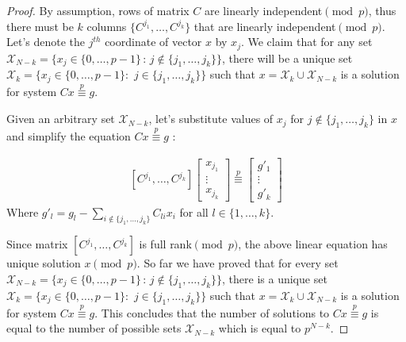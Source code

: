 \documentclass{article}
\begin{document}
\begin{proof}  	
By assumption, rows of matrix $C$ are linearly independent$\pmod{p}$, thus there must be $k$ columns $\{C^{j_1},\ldots,C^{j_k}\}$ that are linearly independent$\pmod{p}$.   
   Let's denote the $j^{th}$ coordinate of vector $x$ by $x_j$. We claim that for any set $\mathcal{X}_{N-k}=\{{x}_j\in\{0,\ldots,p-1\}\, : \, j \notin \{j_1,\ldots,j_k\} \}$, there will be a unique set $\mathcal{X}_k=\{{x}_j\in\{0,\ldots,p-1\}:\,\, j\in\{j_1,\ldots,j_k\}\}$ such that $x=\mathcal{X}_k \cup\mathcal{X}_{N-k}$ is a solution for system $C{x}\overset{p}{\equiv} {g}$.
 
  Given an arbitrary set $\mathcal{X}_{N-k}$, let's substitute values of $x_j$ for $j\notin\{j_1,\ldots,j_{k}\}$ in ${x}$ and simplify the equation $Cx\overset{p}{\equiv} g$ :
 
 $$
  \begin{array}{l}
 [C^{j_1},\ldots, C^{j_k}] 
 \left[ \begin{array}{l}
 x_{j_1} \\
 \vdots \\
 x_{j_k}
 \end{array}	 \right] \overset{p}{\equiv}
 \left[\begin{array}{l}
 g'_{1} \\
 \vdots \\
 g'_{k}
 \end{array}\right] 
  \end{array} 
  $$
Where $g'_{l}= g_l -\sum_{i\notin \{j_1,\ldots,j_k\}} C_{li}x_{i}$ for all $l\in\{1,\ldots,k\}$. 

Since matrix $[C^{j_1},\ldots,C^{j_k}]$ is full rank$\pmod{p}$, the above linear equation has unique solution ${x}\pmod{p}$. So far we have proved that for every set $\mathcal{X}_{N-k}=\{{x}_j\in\{0,\ldots,p-1\}\, : \, j \notin \{j_1,\ldots,j_k\} \}$, there is a unique set $\mathcal{X}_k=\{{x}_j\in\{0,\ldots,p-1\}:\,\, j\in\{j_1,\ldots,j_k\}\}$ such that $x=\mathcal{X}_k \cup\mathcal{X}_{N-k}$ is a solution for system $C{x}\overset{p}{\equiv} {g}$. This concludes that the number of solutions to $C{x}\overset{p}{\equiv} {g}$ is equal to the number of possible sets $\mathcal{X}_{N-k}$ which is equal to $p^{N-k}$. 

\end{proof}
\end{document}
